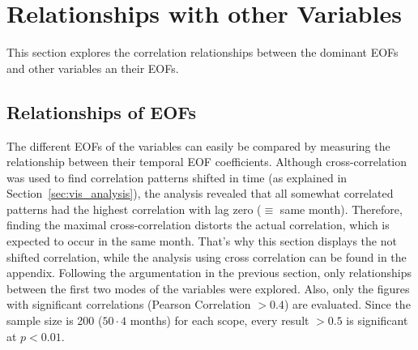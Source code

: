 
\section{Relationships with other Variables}

This section explores the correlation relationships between the dominant EOFs and other variables an their EOFs. 

\subsection{Relationships of EOFs}

The different EOFs of the variables can easily be compared by measuring the relationship between their temporal EOF coefficients. 
Although cross-correlation was used to find correlation patterns shifted in time (as explained in Section~\ref{sec:vis_analysis}), the analysis revealed that all somewhat correlated patterns had the highest correlation with lag zero ($\equiv$ same month). 
Therefore, finding the maximal cross-correlation distorts the actual correlation, which is expected to occur in the same month. 
That's why this section displays the not shifted correlation, while the analysis using cross correlation can be found in the appendix. 
Following the argumentation in the previous section, only relationships between the first two modes of the variables were explored. 
Also, only the figures with significant correlations (Pearson Correlation $> 0.4$) are evaluated. 
Since the sample size is 200 ($50 \cdot 4$ months) for each scope, every result $> 0.5$ is significant at $p < 0.01$.


%
%     
%

